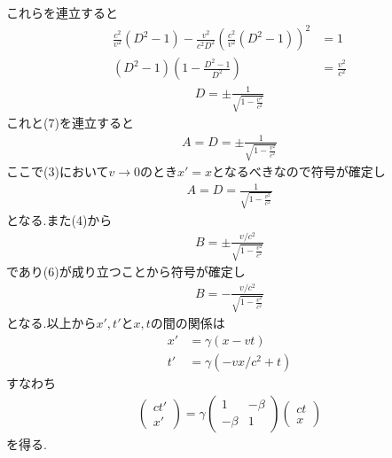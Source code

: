 \documentclass[uplatex,a4j,11pt,dvipdfmx]{jsarticle}
\begin{document}
これらを連立すると
\begin{align*}
  \frac{c^2}{v^2}(D^2-1)-\frac{v^2}{c^2D^2}\left(\frac{c^2}{v^2}(D^2-1)\right)^2&=1\\
  (D^2-1)\left(1-\frac{D^2-1}{D^2}\right)&=\frac{v^2}{c^2}
\end{align*}
\begin{align*}
  D=\pm\frac{1}{\sqrt{1-\frac{v^2}{c^2}}}
\end{align*}
これと(7)を連立すると
\begin{align*}
  A=D=\pm\frac{1}{\sqrt{1-\frac{v^2}{c^2}}}
\end{align*}
ここで(3)において$v\rightarrow0$のとき$x'=x$となるべきなので符号が確定し
\begin{align}
  A=D=\frac{1}{\sqrt{1-\frac{v^2}{c^2}}}
\end{align}
となる.また(4)から
\begin{align*}
  B=\pm\frac{v/c^2}{\sqrt{1-\frac{v^2}{c^2}}}
\end{align*}
であり(6)が成り立つことから符号が確定し
\begin{align*}
  B=-\frac{v/c^2}{\sqrt{1-\frac{v^2}{c^2}}}
\end{align*}
となる.以上から$x',t'$と$x,t$の間の関係は
\begin{align*}
  x'&=\gamma(x-vt)\\
  t'&=\gamma(-vx/c^2+t)
\end{align*}
すなわち
\begin{align*}
  \left(\begin{array}{c}
    ct'\\x'
  \end{array}\right)
  =\gamma\left(\begin{array}{cc}
    1&-\beta\\
    -\beta&1
  \end{array}\right)
  \left(\begin{array}{c}
    ct\\x
  \end{array}\right)
\end{align*}
を得る.
\end{document}
